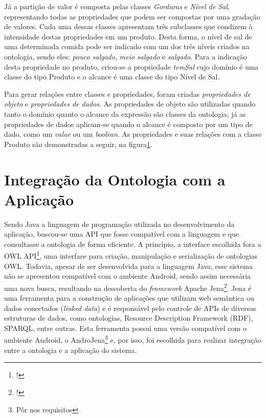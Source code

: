 Já a partição de valor é composta pelas classes \emph{Gorduras} e \emph{Nível de Sal}, representando todas as propriedades que podem ser compostas por uma gradação de valores. Cada uma dessas classes apresentam três subclasses que condizem à intensidade destas propriedades em um produto. Desta forma, o nível de sal de uma determinada comida pode ser indicado com um dos três níveis criados na ontologia, sendo eles: \emph{pouco salgado}, \emph{meio salgado} e \emph{salgado}. Para a indicação desta propriedade no produto, criou-se a propriedade \emph{temSal} cujo domínio é uma classe do tipo Produto e o alcance é uma classe do tipo Nível de Sal. 

Para gerar relações entre classes e propriedades, foram criadas \emph{propriedades de objeto} e \emph{propriedades de dados}. As propriedades de objeto são utilizadas quando tanto o domínio quanto o alcance da expressão são classes da ontologia; já as propriedades de dados aplicam-se quando o alcance é composto por um tipo de dado, como um \emph{value} ou um \emph{boolean}. As propriedades e suas relações com a classe Produto são demonstradas a seguir, na figura\ref{}.
\begin{figure}
\end{figure}

\section{Integração da Ontologia com a Aplicação}

Sendo Java a linguagem de programação utilizada no desenvolvimento da aplicação, buscou-se uma API que fosse compatível com a linguagem e que consultasse a ontologia de forma eficiente. A princípio, a interface escolhida fora a OWL API\footnote{!}, uma interface para criação, manipulação e serialização de ontologias OWL. Todavia, apesar de ser desenvolvida para a linguagem Java, esse sistema não se apresentou compatível com o ambiente Android, sendo assim necessária uma nova busca, resultando na descoberta do \emph{framework} Apache Jena\footnote{!}. Jena é uma ferramenta para a construção de aplicações que utilizam web semântica ou dados conectados (\emph{linked data}) e é responsável pelo controle de APIs de diversas estruturas de dados, como ontologias, Resource Description Framework (RDF), SPARQL, entre outras. Esta ferramenta possui uma versão compatível com o ambiente Android, o AndroJena\footnote{Pôr nos requisitos} e, por isso, foi escolhida para realizar integração entre a ontologia e a aplicação do sistema.

